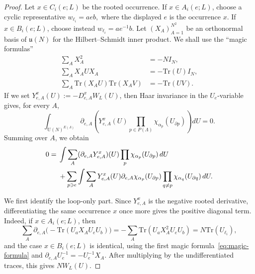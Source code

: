 \documentclass[11pt,a4paper,reqno]{amsart}
\theoremstyle{definition}
\theoremstyle{remark}
\newcommand\U{{\mathrm U}}
\newcommand\Tr{{\mathrm{Tr}}}
\begin{document}
\begin{proof}
Let $x\in C_i(e;L)$ be the rooted occurrence.  If $x\in A_i(e;L)$, choose a cyclic representative $w_{\ell_i}=a e b,$ where the displayed $e$ is the occurrence $x$.  If $x\in B_i(e;L)$, choose instead $w_{\ell_i}=a e^{-1}b.$ Let $(X_A)_{A=1}^{N^2}$ be an orthonormal basis of $\mathfrak u(N)$ for the Hilbert--Schmidt inner product. We shall use the ``magic formulas'' \cite{DHK13}
\begin{equation}\label{eq:magic-formula}
\begin{aligned}
\sum_A X_A^2&=-NI_N,\\
\sum_A X_AUX_A&=-\Tr(U)I_N,\\
\sum_A\Tr(X_AU)\Tr(X_AV)&=-\Tr(UV).
\end{aligned}
\end{equation}
If we set $Y^x_{e,A}(U):=-D^x_{e,A}W_L(U)$, then Haar invariance in the $U_e$-variable gives, for every $A$,
\[
\int_{\U(N)^{E(\Lambda)}}\partial_{e,A}
\left(
Y^x_{e,A}(U)\prod_{p\in P(\Lambda)}\chi_{\alpha_p}(U_{\partial p})
\right)dU=0.
\]
Summing over $A$, we obtain
\begin{align}\label{eq:rooted-ibp-expanded}
0={}&
\int\sum_A(\partial_{e,A}Y^x_{e,A})(U)
\prod_{p}\chi_{\alpha_p}(U_{\partial p})\,dU\notag\\
&+
\sum_{p\ni e}
\int\sum_A Y^x_{e,A}(U)
\partial_{e,A}\chi_{\alpha_p}(U_{\partial p})
\prod_{q\neq p}\chi_{\alpha_q}(U_{\partial q})\,dU.
\end{align}

We first identify the loop-only part.  Since $Y^x_{e,A}$ is the negative rooted derivative, differentiating the same occurrence $x$ once more gives the positive diagonal term.  Indeed, if $x\in A_i(e;L)$, then
\[
\sum_A \partial_{e,A}\bigl(-\Tr(U_aX_AU_eU_b)\bigr)
=
-\sum_A\Tr(U_aX_A^2U_eU_b)
=
N\Tr(U_{\ell_i}),
\]
and the case $x\in B_i(e;L)$ is identical, using the first magic formula~\eqref{eq:magic-formula} and $\partial_{e,A}U_e^{-1}=-U_e^{-1}X_A$.  After multiplying by the undifferentiated traces, this gives $N W_L(U)$.


\end{proof}
\end{document}
